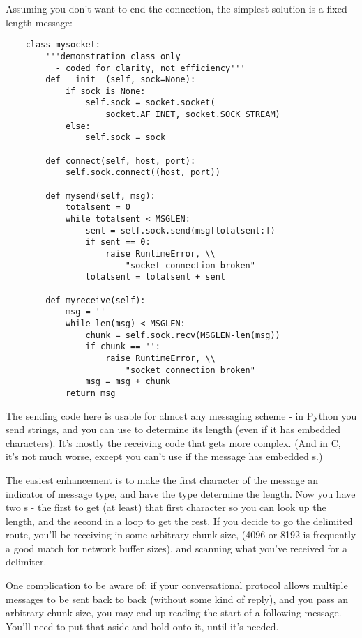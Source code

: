 \documentclass{howto}
\begin{document}
Assuming you don't want to end the connection, the simplest solution
is a fixed length message:

\begin{verbatim}
    class mysocket:
        '''demonstration class only 
          - coded for clarity, not efficiency'''
        def __init__(self, sock=None):
            if sock is None:
                self.sock = socket.socket(
                    socket.AF_INET, socket.SOCK_STREAM)
            else:
                self.sock = sock

        def connect(self, host, port):
            self.sock.connect((host, port))

        def mysend(self, msg):
            totalsent = 0
            while totalsent < MSGLEN:
                sent = self.sock.send(msg[totalsent:])
                if sent == 0:
                    raise RuntimeError, \\
                        "socket connection broken"
                totalsent = totalsent + sent

        def myreceive(self):
            msg = ''
            while len(msg) < MSGLEN:
                chunk = self.sock.recv(MSGLEN-len(msg))
                if chunk == '':
                    raise RuntimeError, \\
                        "socket connection broken"
                msg = msg + chunk
            return msg
\end{verbatim}

The sending code here is usable for almost any messaging scheme - in
Python you send strings, and you can use  to
determine its length (even if it has embedded 
characters). It's mostly the receiving code that gets more
complex. (And in C, it's not much worse, except you can't use
 if the message has embedded s.)

The easiest enhancement is to make the first character of the message
an indicator of message type, and have the type determine the
length. Now you have two s - the first to get (at
least) that first character so you can look up the length, and the
second in a loop to get the rest. If you decide to go the delimited
route, you'll be receiving in some arbitrary chunk size, (4096 or 8192
is frequently a good match for network buffer sizes), and scanning
what you've received for a delimiter.

One complication to be aware of: if your conversational protocol
allows multiple messages to be sent back to back (without some kind of
reply), and you pass  an arbitrary chunk size, you
may end up reading the start of a following message. You'll need to
put that aside and hold onto it, until it's needed.
\end{document}
